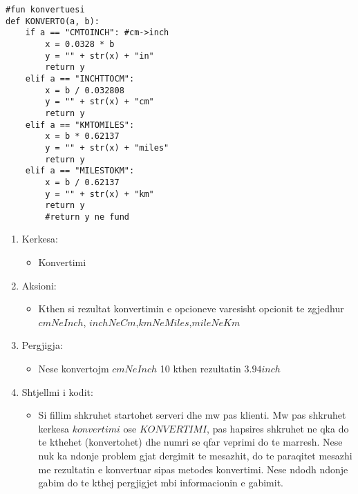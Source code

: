 \documentclass[]{article}
\begin{document}
\begin{lstlisting}
#fun konvertuesi
def KONVERTO(a, b):
    if a == "CMTOINCH": #cm->inch
        x = 0.0328 * b
        y = "" + str(x) + "in"
        return y
    elif a == "INCHTTOCM":
        x = b / 0.032808
        y = "" + str(x) + "cm"
        return y
    elif a == "KMTOMILES":
        x = b * 0.62137
        y = "" + str(x) + "miles"
        return y
    elif a == "MILESTOKM":
        x = b / 0.62137
        y = "" + str(x) + "km"
        return y
        #return y ne fund
\end{lstlisting}
\begin{enumerate}
\item Kerkesa:
\begin{itemize}
\item Konvertimi
\end{itemize}
\item Aksioni:
\begin{itemize}
\item Kthen si rezultat konvertimin e opcioneve varesisht opcionit te zgjedhur $cmNeInch$, $inchNeCm$,$kmNeMiles$,$mileNeKm$ 
\end{itemize}
\item Pergjigja:
\begin{itemize}
\item Nese konvertojm $cmNeInch$ 10 kthen rezultatin $3.94 inch$
\end{itemize}
\item Shtjellmi i kodit:
\begin{itemize}
\item Si fillim shkruhet startohet serveri dhe mw pas klienti. Mw pas
shkruhet kerkesa $konvertimi$ ose $KONVERTIMI$, pas hapsires
shkruhet ne qka do te kthehet (konvertohet) dhe numri se
qfar veprimi do te marresh. Nese nuk ka ndonje problem gjat
dergimit te mesazhit, do te  paraqitet mesazhi me
rezultatin e konvertuar sipas metodes konvertimi. Nese
ndodh ndonje gabim do te kthej pergjigjet mbi informacionin e gabimit.
\end{itemize}
\end{enumerate}
\newpage
\end{document}
